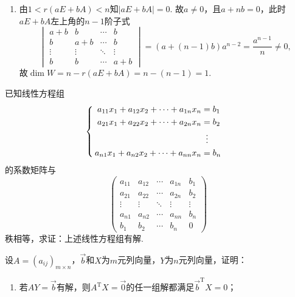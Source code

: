 \begin{exercise}
\begin{exgroup}
\begin{answer}
\begin{enumerate}
                \item 由$1<r(aE+bA)<n$知$|aE+bA|=0$. 故$a\neq 0$，且$a+nb=0$，此时$aE+bA$左上角的$n-1$阶子式
                      \[ \begin{vmatrix}
                              a+b    & b      & \cdots & b      \\
                              b      & a+b    & \cdots & b      \\
                              \vdots & \vdots & \ddots & \vdots \\
                              b      & b      & \cdots & a+b
                          \end{vmatrix}=(a+(n-1)b)a^{n-2}=\frac{a^{n-1}}{n}\neq 0, \]
                      故$\dim{W}=n-r(aE+bA)=n-(n-1)=1$.
            \end{enumerate}
        \end{answer}

        \item 已知线性方程组
        \[\begin{cases} \begin{aligned}
                    a_{11}x_1+a_{12}x_2+\cdots+a_{1n}x_n & =b_1            \\
                    a_{21}x_1+a_{22}x_2+\cdots+a_{2n}x_n & =b_2            \\
                                                         & \vdotswithin{=} \\
                    a_{n1}x_1+a_{n2}x_2+\cdots+a_{nn}x_n & =b_n            \\
                \end{aligned} \end{cases}\]
        的系数矩阵与
        \[\begin{pmatrix}
                a_{11} & a_{12} & \cdots & a_{1n} & b_1    \\
                a_{21} & a_{22} & \cdots & a_{2n} & b_2    \\
                \vdots & \vdots & \ddots & \vdots & \vdots \\
                a_{n1} & a_{n2} & \cdots & a_{nn} & b_n    \\
                b_1    & b_2    & \cdots & b_n    & 0
            \end{pmatrix}\]
        秩相等，求证：上述线性方程组有解.

        \item 设$A=(a_{ij})_{m\times n}$，$\vec{b}$和$X$为$m$元列向量，$Y$为$n$元列向量，证明：
        \begin{enumerate}
            \item 若$AY=\vec{b}$有解，则$A^\mathrm{T}X=\vec{0}$的任一组解都满足$\vec{b}^\mathrm{T}X=0$；


\end{enumerate}
\end{exgroup}
\end{exercise}
